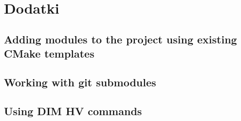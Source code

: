 \appendix
\chapter{Dodatki}
\label{ch:extras}

\section{Adding modules to the project using existing CMake templates}

\section{Working with git submodules}

\section{Using DIM HV commands}

